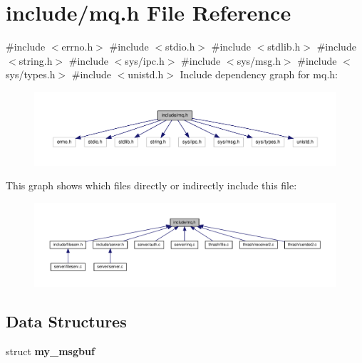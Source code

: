 \section{include/mq.h File Reference}
\label{mq_8h}
{\ttfamily \#include $<$errno.\+h$>$}\newline
{\ttfamily \#include $<$stdio.\+h$>$}\newline
{\ttfamily \#include $<$stdlib.\+h$>$}\newline
{\ttfamily \#include $<$string.\+h$>$}\newline
{\ttfamily \#include $<$sys/ipc.\+h$>$}\newline
{\ttfamily \#include $<$sys/msg.\+h$>$}\newline
{\ttfamily \#include $<$sys/types.\+h$>$}\newline
{\ttfamily \#include $<$unistd.\+h$>$}\newline
Include dependency graph for mq.\+h\+:\nopagebreak
\begin{figure}[H]
\begin{center}
\leavevmode
\includegraphics[width=350pt]{mq_8h__incl}
\end{center}
\end{figure}
This graph shows which files directly or indirectly include this file\+:\nopagebreak
\begin{figure}[H]
\begin{center}
\leavevmode
\includegraphics[width=350pt]{mq_8h__dep__incl}
\end{center}
\end{figure}
\subsection*{Data Structures}
\begin{DoxyCompactItemize}
\item 
struct \textbf{ my\+\_\+msgbuf}
\end{DoxyCompactItemize}
